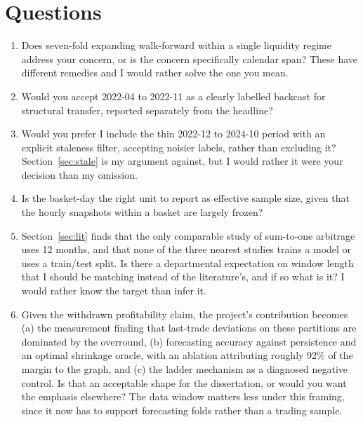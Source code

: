 \documentclass[11pt,a4paper]{article}
\begin{document}
\section{Questions}
\label{sec:questions}

\begin{enumerate}
  \item Does seven-fold expanding walk-forward within a single liquidity
        regime address your concern, or is the concern specifically calendar
        span? These have different remedies and I would rather solve the one
        you mean.
  \item Would you accept 2022-04 to 2022-11 as a clearly labelled backcast
        for structural transfer, reported separately from the headline?
  \item Would you prefer I include the thin 2022-12 to 2024-10 period with an
        explicit staleness filter, accepting noisier labels, rather than
        excluding it? Section~\ref{sec:stale} is my argument against, but I
        would rather it were your decision than my omission.
  \item Is the basket-day the right unit to report as effective sample size,
        given that the hourly snapshots within a basket are largely frozen?

  \item Section~\ref{sec:lit} finds that the only comparable study of
        sum-to-one arbitrage uses 12 months, and that none of the three
        nearest studies trains a model or uses a train/test split. Is there a
        departmental expectation on window length that I should be matching
        instead of the literature's, and if so what is it? I would rather
        know the target than infer it.

  \item Given the withdrawn profitability claim, the project's contribution
        becomes (a) the measurement finding that last-trade deviations on
        these partitions are dominated by the overround, (b) forecasting
        accuracy against persistence and an optimal shrinkage oracle, with an
        ablation attributing roughly 92\% of the margin to the graph, and (c)
        the ladder mechanism as a diagnosed negative control. Is that an
        acceptable shape for the dissertation, or would you want the emphasis
        elsewhere? The data window matters less under this framing, since it
        now has to support forecasting folds rather than a trading sample.
\end{enumerate}
\end{document}
